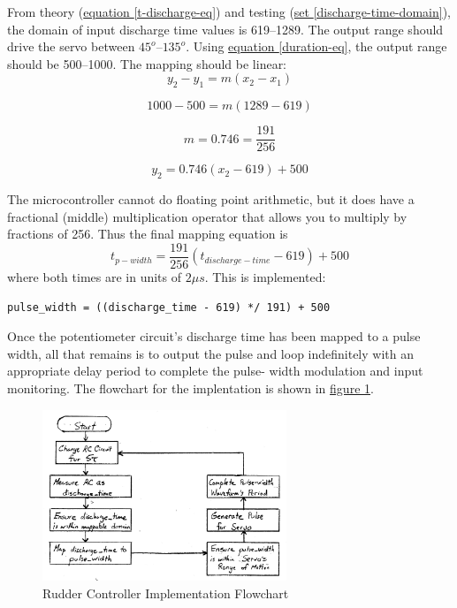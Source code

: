 \documentclass[11pt]{article}
\begin{document}
From theory (\hyperref[t-discharge-eq]{equation \ref{t-discharge-eq}})
and testing (\hyperref[discharge-time-domain]{set \ref{discharge-time-domain}}),
the domain of input discharge time values is 619--1289.
The output range should drive the servo between $45^{o}$--$135^{o}$.
Using \hyperref[duration-eq]{equation \ref{duration-eq}}, the output
range should be 500--1000. The mapping should be linear:
\begin{equation*}
y_{2}-y_{1}=m(x_{2}-x_{1})
\end{equation*}

\begin{equation*}
1000-500=m(1289-619)
\end{equation*}

\begin{equation*}
m=0.746=\frac{191}{256}
\end{equation*}

\begin{equation*}
y_{2}=0.746(x_{2}-619)+500
\end{equation*}

The microcontroller cannot do floating point arithmetic, but it does
have a fractional (middle) multiplication operator that allows you
to multiply by fractions of 256. Thus the final mapping equation is
\begin{equation}
t_{p-width}=\frac{191}{256}(t_{discharge-time}-619)+500
\end{equation}
where both times are in units of $2\mu s$. This is implemented:

\begin{center}
\mbox{\texttt{pulse\_width = ((discharge\_time - 619) */ 191) + 500}}
\end{center}

Once the potentiometer circuit's discharge time has been mapped
to a pulse width, all that remains is to output the pulse and loop
indefinitely with an appropriate delay period to complete the pulse-
width modulation and input monitoring. The flowchart for the implentation
is shown in \hyperref[rudder-flowchart]{figure \ref{rudder-flowchart}}.

\begin{figure}[ht]
\centering
\includegraphics[width=0.65\textwidth]{rudder-flowchart.pdf}
\caption{Rudder Controller Implementation Flowchart}
\label{rudder-flowchart}
\end{figure}
\end{document}
